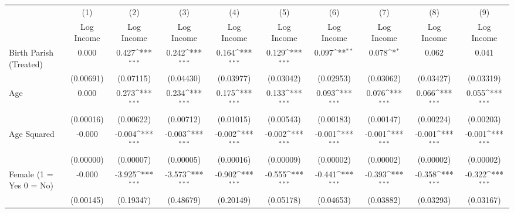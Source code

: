 {
\def\sym#1{\ifmmode^{#1}\else\(^{#1}\)\fi}
\begin{tabular}{l*{9}{c}}
\hline\hline
                    &\multicolumn{1}{c}{(1)}&\multicolumn{1}{c}{(2)}&\multicolumn{1}{c}{(3)}&\multicolumn{1}{c}{(4)}&\multicolumn{1}{c}{(5)}&\multicolumn{1}{c}{(6)}&\multicolumn{1}{c}{(7)}&\multicolumn{1}{c}{(8)}&\multicolumn{1}{c}{(9)}\\
                    &\multicolumn{1}{c}{Log Income}&\multicolumn{1}{c}{Log Income}&\multicolumn{1}{c}{Log Income}&\multicolumn{1}{c}{Log Income}&\multicolumn{1}{c}{Log Income}&\multicolumn{1}{c}{Log Income}&\multicolumn{1}{c}{Log Income}&\multicolumn{1}{c}{Log Income}&\multicolumn{1}{c}{Log Income}\\
\hline
Birth Parish (Treated)&       0.000         &       0.427\sym{***}&       0.242\sym{***}&       0.164\sym{***}&       0.129\sym{***}&       0.097\sym{**} &       0.078\sym{*}  &       0.062         &       0.041         \\
                    &   (0.00691)         &   (0.07115)         &   (0.04430)         &   (0.03977)         &   (0.03042)         &   (0.02953)         &   (0.03062)         &   (0.03427)         &   (0.03319)         \\
Age                 &       0.000         &       0.273\sym{***}&       0.234\sym{***}&       0.175\sym{***}&       0.133\sym{***}&       0.093\sym{***}&       0.076\sym{***}&       0.066\sym{***}&       0.055\sym{***}\\
                    &   (0.00016)         &   (0.00622)         &   (0.00712)         &   (0.01015)         &   (0.00543)         &   (0.00183)         &   (0.00147)         &   (0.00224)         &   (0.00203)         \\
Age Squared         &      -0.000         &      -0.004\sym{***}&      -0.003\sym{***}&      -0.002\sym{***}&      -0.002\sym{***}&      -0.001\sym{***}&      -0.001\sym{***}&      -0.001\sym{***}&      -0.001\sym{***}\\
                    &   (0.00000)         &   (0.00007)         &   (0.00005)         &   (0.00016)         &   (0.00009)         &   (0.00002)         &   (0.00002)         &   (0.00002)         &   (0.00002)         \\
Female (1 = Yes 0 = No)&      -0.000         &      -3.925\sym{***}&      -3.573\sym{***}&      -0.902\sym{***}&      -0.555\sym{***}&      -0.441\sym{***}&      -0.393\sym{***}&      -0.358\sym{***}&      -0.322\sym{***}\\
                    &   (0.00145)         &   (0.19347)         &   (0.48679)         &   (0.20149)         &   (0.05178)         &   (0.04653)         &   (0.03882)         &   (0.03293)         &   (0.03167)         \\

\end{tabular}}
